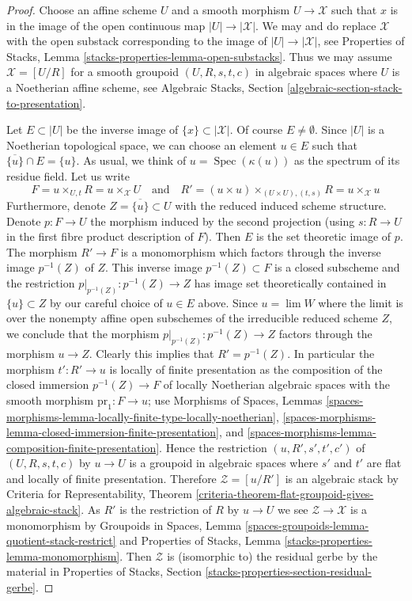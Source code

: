 \documentclass[10pt,a4paper]{amsart}
\theoremstyle{plain}
\theoremstyle{definition}
\theoremstyle{remark}
\numberwithin{equation}{subsection}
\def\lim{\mathop{\mathrm{lim}}\nolimits}
\def\Spec{\mathop{\mathrm{Spec}}}
\begin{document}
\begin{proof}
Choose an affine scheme $U$ and a smooth morphism $U \to \mathcal{X}$
such that $x$ is in the image of the open continuous map
$|U| \to |\mathcal{X}|$. We may and do replace $\mathcal{X}$
with the open substack corresponding to the image of $|U| \to |\mathcal{X}|$,
see Properties of Stacks, Lemma \ref{stacks-properties-lemma-open-substacks}.
Thus we may assume $\mathcal{X} = [U/R]$ for a smooth
groupoid $(U, R, s, t, c)$ in algebraic spaces
where $U$ is a Noetherian affine scheme, see
Algebraic Stacks, Section \ref{algebraic-section-stack-to-presentation}.

\medskip\noindent
Let $E \subset |U|$ be the inverse image of $\{x\} \subset |\mathcal{X}|$.
Of course $E \not = \emptyset$.
Since $|U|$ is a Noetherian topological space, we can choose an element
$u \in E$ such that $\overline{\{u\}} \cap E = \{u\}$.
As usual, we think of $u = \Spec(\kappa(u))$ as the spectrum of
its residue field. Let us write
$$
F = u \times_{U, t} R = u \times_\mathcal{X} U
\quad\text{and}\quad
R' = (u \times u) \times_{(U \times U), (t, s)} R = u \times_\mathcal{X} u
$$
Furthermore, denote $Z = \overline{\{u\}} \subset U$ with the reduced
induced scheme structure. Denote $p : F \to U$ the morphism induced
by the second projection (using $s : R \to U$ in the first fibre product
description of $F$). Then $E$ is the set theoretic image of $p$.
The morphism $R' \to F$ is a monomorphism which factors through the
inverse image $p^{-1}(Z)$ of $Z$. This inverse image
$p^{-1}(Z) \subset F$ is a closed subscheme and
the restriction $p|_{p^{-1}(Z)} : p^{-1}(Z) \to Z$ has image
set theoretically contained in $\{u\} \subset Z$ by our careful
choice of $u \in E$ above. Since $u = \lim W$ where the limit
is over the nonempty affine open subschemes of the irreducible reduced scheme
$Z$, we conclude that the morphism $p|_{p^{-1}(Z)} : p^{-1}(Z) \to Z$
factors through the morphism $u \to Z$. Clearly this implies that
$R' = p^{-1}(Z)$. In particular the morphism $t' : R' \to u$ is
locally of finite presentation as the composition of the closed
immersion $p^{-1}(Z) \to F$ of locally Noetherian algebraic spaces
with the smooth morphism $\text{pr}_1 : F \to u$; use
Morphisms of Spaces, Lemmas
\ref{spaces-morphisms-lemma-locally-finite-type-locally-noetherian},
\ref{spaces-morphisms-lemma-closed-immersion-finite-presentation}, and
\ref{spaces-morphisms-lemma-composition-finite-presentation}.
Hence the restriction $(u, R', s', t', c')$ of $(U, R, s, t, c)$
by $u \to U$ is a groupoid in algebraic spaces where $s'$ and $t'$
are flat and locally of finite presentation. Therefore
$\mathcal{Z} = [u/R']$ is an algebraic stack by
Criteria for Representability, Theorem
\ref{criteria-theorem-flat-groupoid-gives-algebraic-stack}.
As $R'$ is the restriction of $R$ by $u \to U$ we see
$\mathcal{Z} \to \mathcal{X}$ is a monomorphism by
Groupoids in Spaces, Lemma
\ref{spaces-groupoids-lemma-quotient-stack-restrict}
and
Properties of Stacks, Lemma \ref{stacks-properties-lemma-monomorphism}.
Then $\mathcal{Z}$ is (isomorphic to) the residual gerbe by
the material in Properties of Stacks, Section
\ref{stacks-properties-section-residual-gerbe}.
\end{proof}
\end{document}
